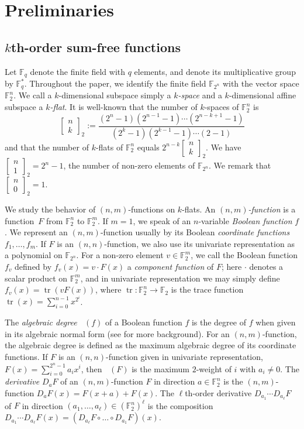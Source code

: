 \documentclass[12pt]{article}
\theoremstyle{definition}
\newcommand{\Gauss}[2]{{\begin{bmatrix} #1 \\ #2 \end{bmatrix}_2}}
\newcommand{\F}{\mathbb F}
\newcommand{\Fpn}{\mathbb{F}_{2^n}}
\newcommand{\Fpnv}{\mathbb{F}_2^n}
\newcommand{\Fpmv}{\mathbb{F}_2^m}
\DeclareMathOperator{\degalg}{\deg_{{alg}}}
\DeclareMathOperator{\tr}{tr}
\newcounter{numb}
\begin{document}
\section{Preliminaries}
\label{sec:preliminaries}

\subsection{$k$th-order sum-free functions}
\label{subsec:sum-free_functions}
Let $\F_q$ denote the finite field with $q$ elements, and denote its multiplicative group by $\F_q^*$. Throughout the paper, we identify the finite field $\Fpn$ with the vector space $\Fpnv$. We call a $k$-dimensional subspace simply a \emph{$k$-space} and a $k$-dimensional affine subspace a \emph{$k$-flat}. It is well-known that the number of $k$-spaces of $\Fpnv$ is
\[
     \Gauss{n}{k} := \frac{(2^{n}-1)(2^{n-1}-1) \cdots (2^{n-k+1}-1)} {(2^{k}-1)(2^{k-1}-1)\cdots(2-1)}
\]
and that the number of $k$-flats of $\Fpnv$ equals $2^{n-k}\Gauss{n}{k}$.
We have $\Gauss{n}{1} = 2^n-1$, the number of non-zero elements of $\F_{2^n}$. We remark that $\Gauss{n}{0} = 1$. \par

We study the behavior of $(n,m)$-functions on $k$-flats. An \emph{$(n,m)$-function} is a function~$F$ from $\Fpnv$ to $\Fpmv$. If $m=1$, we speak of an $n$-variable \emph{Boolean function} $f$. We represent an $(n,m)$-function usually by its Boolean \emph{coordinate functions} $f_1,\dots,f_m$. If $F$ is an $(n,n)$-function, we also use its univariate representation as a polynomial on $\Fpn$. For a non-zero element $v\in\Fpmv$, we call the Boolean function $f_v$ defined by $f_v(x) = v\cdot F(x)$ a \emph{component function} of $F$; here $\cdot$ denotes a scalar product on $\Fpmv$, and in univariate representation we may simply define $f_v(x)=\tr(vF(x))$, where $\tr \colon \Fpnv \to \F_2$ is the trace function $\tr(x) = \sum_{i=0}^{n-1}x^{2^i}$.

The \emph{algebraic degree} $\degalg(f)$ of a Boolean function $f$ is the degree of $f$ when given in its algebraic normal form (see \cite{carlet2021book} for more background). For an $(n,m)$-function, the algebraic degree is defined as the maximum algebraic degree of its coordinate functions. If $F$ is an $(n,n)$-function given in univariate representation, $F(x) = \sum_{i=0}^{2^n-1}a_ix^i$, then $\degalg(F)$ is the maximum $2$-weight of $i$ with $a_i \ne 0$. The \emph{derivative} $D_aF$ of an $(n,m)$-function $F$ in direction $a \in \Fpnv$ is the $(n,m)$-function $D_aF(x) = F(x+a)+F(x)$. The $\ell$th-order derivative $D_{a_1}\cdots D_{a_\ell}F$ of $F$ in direction $(a_1,\dots,a_\ell) \in (\Fpnv)^\ell$ is the composition $D_{a_1}\cdots D_{a_\ell}F(x) = (D_{a_\ell}F\circ\dots\circ D_{a_1}F)(x)$.
\end{document}
